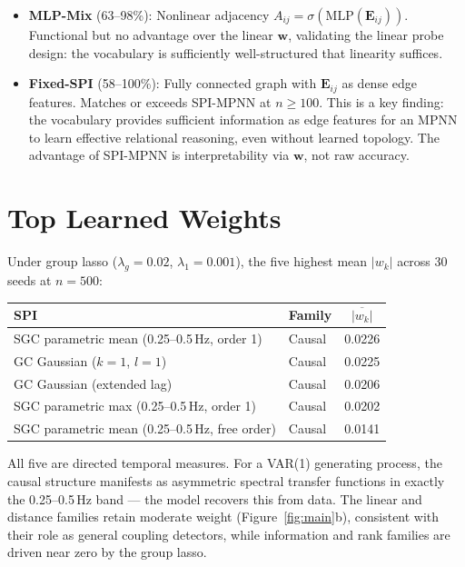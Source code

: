 \documentclass{article}
\begin{document}
\begin{itemize}
\item \textbf{MLP-Mix} (63--98\%): Nonlinear adjacency $A_{ij} = \sigma(\mathrm{MLP}(\mathbf{E}_{ij}))$. Functional but no advantage over the linear $\mathbf{w}$, validating the linear probe design: the vocabulary is sufficiently well-structured that linearity suffices.

\item \textbf{Fixed-SPI} (58--100\%): Fully connected graph with $\mathbf{E}_{ij}$ as dense edge features. Matches or exceeds SPI-MPNN at $n \geq 100$. This is a key finding: the vocabulary provides sufficient information as edge features for an MPNN to learn effective relational reasoning, even without learned topology. The advantage of SPI-MPNN is interpretability via $\mathbf{w}$, not raw accuracy.
\end{itemize}

\section{Top Learned Weights}
\label{app:weights}

Under group lasso ($\lambda_g{=}0.02$, $\lambda_1{=}0.001$), the five highest mean $|w_k|$ across 30 seeds at $n{=}500$:

\begin{table}[h]
\begin{center}
\begin{small}
\begin{tabular}{llc}
\toprule
SPI & Family & $\overline{|w_k|}$ \\
\midrule
SGC parametric mean (0.25--0.5\,Hz, order 1) & Causal & 0.0226 \\
GC Gaussian ($k{=}1$, $l{=}1$) & Causal & 0.0225 \\
GC Gaussian (extended lag) & Causal & 0.0206 \\
SGC parametric max (0.25--0.5\,Hz, order 1) & Causal & 0.0202 \\
SGC parametric mean (0.25--0.5\,Hz, free order) & Causal & 0.0141 \\
\bottomrule
\end{tabular}
\end{small}
\end{center}
\end{table}

All five are directed temporal measures. For a VAR(1) generating process, the causal structure manifests as asymmetric spectral transfer functions in exactly the 0.25--0.5\,Hz band --- the model recovers this from data. The linear and distance families retain moderate weight (Figure~\ref{fig:main}b), consistent with their role as general coupling detectors, while information and rank families are driven near zero by the group lasso.
\end{document}

